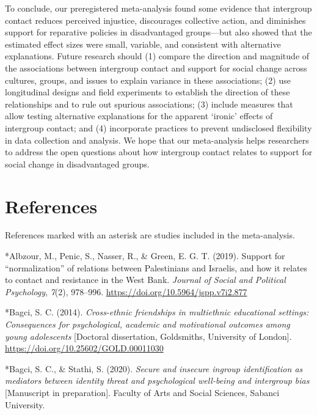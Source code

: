 \documentclass[12pt, letterpaper]{article}
\newcommand{\refsection}{\newpage \section{References}}
\begin{document}
To conclude, our preregistered meta-analysis found some evidence that
intergroup contact reduces perceived injustice, discourages collective
action, and diminishes support for reparative policies in disadvantaged
groups---but also showed that the estimated effect sizes were small,
variable, and consistent with alternative explanations. Future research
should (1) compare the direction and magnitude of the associations
between intergroup contact and support for social change across
cultures, groups, and issues to explain variance in these associations;
(2) use longitudinal designs and field experiments to establish the
direction of these relationships and to rule out spurious associations;
(3) include measures that allow testing alternative explanations for the
apparent `ironic' effects of intergroup contact; and (4) incorporate
practices to prevent undisclosed flexibility in data collection and
analysis. We hope that our meta-analysis helps researchers to address
the open questions about how intergroup contact relates to support for
social change in disadvantaged groups.

\refsection

\noindent References marked with an asterisk are studies included in the
meta-analysis.

\begingroup

\noindent \setlength{\parindent}{-0.5in} \setlength{\leftskip}{0.5in}
\small

\hypertarget{refs}{}
\leavevmode\hypertarget{ref-3201}{}%
*Albzour, M., Penic, S., Nasser, R., \& Green, E. G. T. (2019). Support
for ``normalization'' of relations between Palestinians and Israelis,
and how it relates to contact and resistance in the West Bank.
\emph{Journal of Social and Political Psychology}, \emph{7}(2),
978--996. \url{https://doi.org/10.5964/jspp.v7i2.877}

\leavevmode\hypertarget{ref-2023}{}%
*Bagci, S. C. (2014). \emph{Cross-ethnic friendships in multiethnic
educational settings: Consequences for psychological, academic and
motivational outcomes among young adolescents} {[}Doctoral dissertation,
Goldsmiths, University of London{]}.
\url{https://doi.org/10.25602/GOLD.00011030}

\leavevmode\hypertarget{ref-2395}{}%
*Bagci, S. C., \& Stathi, S. (2020). \emph{Secure and insecure ingroup
identification as mediators between identity threat and psychological
well-being and intergroup bias} {[}Manuscript in preparation{]}. Faculty
of Arts and Social Sciences, Sabanci University.
\end{document}
